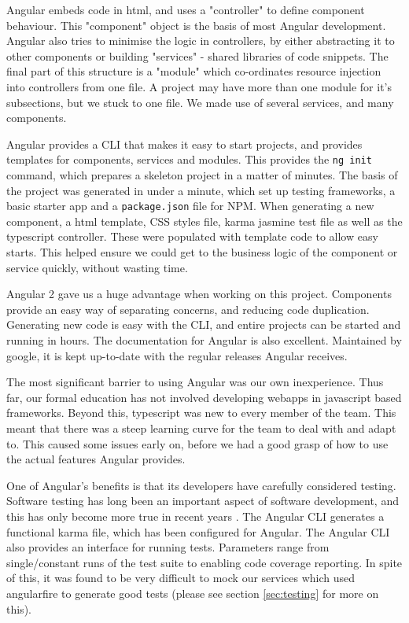 \documentclass{l3proj}
\begin{document}
Angular embeds code in html, and uses a "controller" to define component behaviour. This
 "component" object is the basis of most Angular development. Angular also tries
 to minimise the logic in controllers, by either abstracting it to other components
 or building "services" - shared libraries of code snippets. The final part of this
 structure is a "module" which co-ordinates resource injection into controllers from one
 file. A project may have more than one module for it's subsections, but we stuck to
 one file. We made use of several services, and many components.

Angular provides a CLI that makes it easy to start projects, and provides
 templates for components, services and modules. This provides the \texttt{ng init}
 command, which prepares a skeleton project in a matter of minutes.
 The basis of the project was generated in under a minute, which set up
 testing frameworks, a basic starter app and a \texttt{package.json} file for NPM.
 When generating a new component, a html template, CSS styles file, karma
 jasmine test file as well as the typescript controller. These were populated
 with template code to allow easy starts. This helped ensure we could get to
 the business logic of the component or service quickly, without wasting time.

  

Angular 2 gave us a huge advantage when working on this project. Components provide
 an easy way of separating concerns, and reducing code duplication. Generating new
 code is easy with the CLI, and entire projects can be started and running
 in hours. The documentation for Angular is also excellent. Maintained by google,
 it is kept up-to-date with the regular releases Angular receives.

The most significant barrier to using Angular was our own inexperience.
 Thus far, our formal education has not involved developing webapps in
 javascript based frameworks. Beyond this, typescript was new to every
 member of the team. This meant that there was a steep learning curve for
 the team to deal with and adapt to. This caused some issues early on,
 before we had a good grasp of how to use the actual features Angular
 provides.

One of Angular's benefits is that its developers have carefully
 considered testing. Software testing has long been an important
 aspect of software development, and this has only become more true
 in recent years \cite{tuteja2012testing}. The Angular CLI generates
 a functional karma file, which has been configured for Angular. The
 Angular CLI also provides an interface for running tests. Parameters
 range from single/constant runs of the test suite to enabling code
 coverage reporting. In spite of this, it was found to be very
 difficult to mock our services which used angularfire to generate
 good tests (please see section \ref{sec:testing} for more on this).
\end{document}
